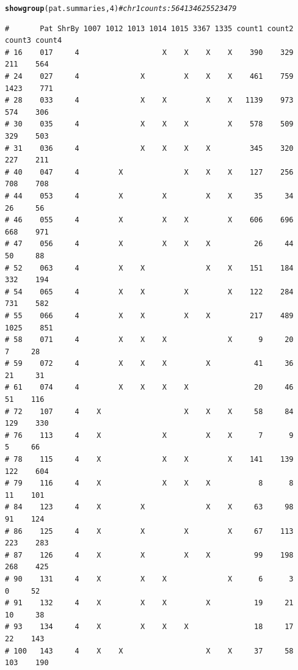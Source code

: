 \documentclass{article}\usepackage[]{graphicx}\usepackage[]{color}
\makeatletter
\newcommand{\hlnum}[1]{\textcolor[rgb]{0.686,0.059,0.569}{#1}}%
\newcommand{\hlcom}[1]{\textcolor[rgb]{0.678,0.584,0.686}{\textit{#1}}}%
\newcommand{\hlstd}[1]{\textcolor[rgb]{0.345,0.345,0.345}{#1}}%
\newcommand{\hlkwd}[1]{\textcolor[rgb]{0.737,0.353,0.396}{\textbf{#1}}}%
\newenvironment{kframe}{%
 \def\at@end@of@kframe{}%
 \ifinner\ifhmode%
  \def\at@end@of@kframe{\end{minipage}}%
  \begin{minipage}{\columnwidth}%
 \fi\fi%
 \def\FrameCommand##1{\hskip\@totalleftmargin \hskip-\fboxsep
 \colorbox{shadecolor}{##1}\hskip-\fboxsep
     \hskip-\linewidth \hskip-\@totalleftmargin \hskip\columnwidth}%
 \MakeFramed {\advance\hsize-\width
   \@totalleftmargin\z@ \linewidth\hsize
   \@setminipage}}%
 {\par\unskip\endMakeFramed%
 \at@end@of@kframe}
\newenvironment{knitrout}{}{} %
\makeatother
\begin{document}
\begin{knitrout}\footnotesize
{}\color{fgcolor}\begin{kframe}
\begin{alltt}
\hlkwd{showgroup}\hlstd{(pat.summaries,}\hlnum{4}\hlstd{)} \hlcom{# chr 1 counts: 564   1346   2552  3479}
\end{alltt}
\begin{verbatim}
#       Pat ShrBy 1007 1012 1013 1014 1015 3367 1335 count1 count2 count3 count4
# 16    017     4                   X    X    X    X    390    329    211    564
# 24    027     4              X         X    X    X    461    759   1423    771
# 28    033     4              X    X         X    X   1139    973    574    306
# 30    035     4              X    X    X         X    578    509    329    503
# 31    036     4              X    X    X    X         345    320    227    211
# 40    047     4         X              X    X    X    127    256    708    708
# 44    053     4         X         X         X    X     35     34     26     56
# 46    055     4         X         X    X         X    606    696    668    971
# 47    056     4         X         X    X    X          26     44     50     88
# 52    063     4         X    X              X    X    151    184    332    194
# 54    065     4         X    X         X         X    122    284    731    582
# 55    066     4         X    X         X    X         217    489   1025    851
# 58    071     4         X    X    X              X      9     20      7     28
# 59    072     4         X    X    X         X          41     36     21     31
# 61    074     4         X    X    X    X               20     46     51    116
# 72    107     4    X                   X    X    X     58     84    129    330
# 76    113     4    X              X         X    X      7      9      5     66
# 78    115     4    X              X    X         X    141    139    122    604
# 79    116     4    X              X    X    X           8      8     11    101
# 84    123     4    X         X              X    X     63     98     91    124
# 86    125     4    X         X         X         X     67    113    223    283
# 87    126     4    X         X         X    X          99    198    268    425
# 90    131     4    X         X    X              X      6      3      0     52
# 91    132     4    X         X    X         X          19     21     10     38
# 93    134     4    X         X    X    X               18     17     22    143
# 100   143     4    X    X                   X    X     37     58    103    190

\end{verbatim}
\end{kframe}
\end{knitrout}
\end{document}
